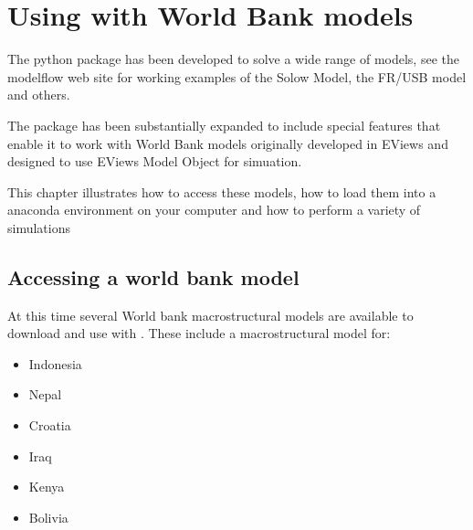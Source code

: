\documentclass[letterpaper,10pt,english]{jupyterBook}
\begin{document}
\sphinxstepscope


\chapter{Using  with World Bank models}
\label{\detokenize{content/06_WBModels/LoadingWBModel:using-modelflow-with-world-bank-models}}\label{\detokenize{content/06_WBModels/LoadingWBModel::doc}}
\sphinxAtStartPar
The  python package has been developed to solve a wide range of models, see the modelflow  web site for working examples of the Solow Model, the FR/USB model and others.

\sphinxAtStartPar
The package has been substantially expanded to include special features that enable it to work with World Bank models originally developed in EViews and designed to use EViews Model Object for simuation.

\sphinxAtStartPar
This chapter illustrates how to access these models, how to load them into a  anaconda environment on your computer and how to perform a variety of simulations


\section{Accessing a world bank model}
\label{\detokenize{content/06_WBModels/LoadingWBModel:accessing-a-world-bank-model}}
\sphinxAtStartPar
At this time several World bank macrostructural models are available to download and use with .  These include a macrostructural model for:
\begin{itemize}
\item {} 
\sphinxAtStartPar
Indonesia

\item {} 
\sphinxAtStartPar
Nepal

\item {} 
\sphinxAtStartPar
Croatia

\item {} 
\sphinxAtStartPar
Iraq

\item {} 
\sphinxAtStartPar
Kenya

\item {} 
\sphinxAtStartPar
Bolivia

\end{itemize}
\end{document}
